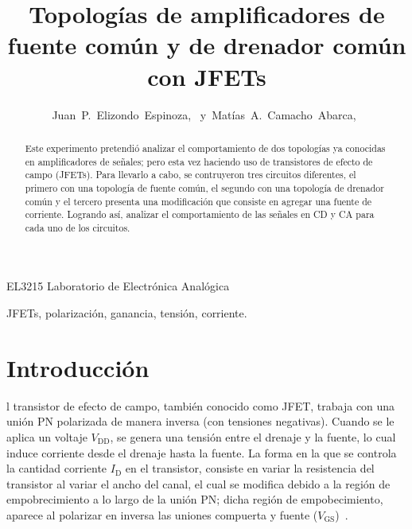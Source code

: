 \documentclass[journal]{IEEEtran}
\begin{document}
\title{Topologías de amplificadores de fuente común y de drenador común con JFETs}


\author{Juan~P.~Elizondo~Espinoza,~
        y~Matías~A.~Camacho~Abarca,~
}


%
{EL3215 Laboratorio de Electrónica Analógica}


\maketitle


\begin{abstract}
Este experimento pretendió analizar el comportamiento de dos topologías ya conocidas en amplificadores de señales; pero esta vez haciendo uso de
transistores de efecto de campo (JFETs). Para llevarlo a cabo, se contruyeron tres circuitos diferentes, el primero con una topología de 
fuente común, el segundo con una topología de drenador común y el tercero presenta una modificación que consiste en agregar una fuente de corriente.
Logrando así, analizar el comportamiento de las señales en CD y CA para cada uno de los circuitos. 
\end{abstract}

\begin{IEEEkeywords}
JFETs, polarización, ganancia, tensión, corriente.
\end{IEEEkeywords}


\section{Introducción}

l transistor de efecto de campo, también conocido como JFET, trabaja con una unión PN
polarizada de manera inversa (con tensiones negativas). Cuando se le aplica un voltaje $V_{\text{DD}}$, se genera 
una tensión entre el drenaje y la fuente, lo cual induce corriente desde el drenaje hasta la fuente. La forma en la 
que se controla la cantidad corriente $I_{\text{D}}$ en el transistor, consiste en variar la resistencia del transistor
al variar el ancho del canal, el cual se modifica debido a la región de empobrecimiento a lo largo de la unión PN;
dicha región de empobecimiento, aparece al polarizar en inversa las uniones compuerta y fuente ($V_{\text{GS}}$)~\cite{Floyd}.
\end{document}

